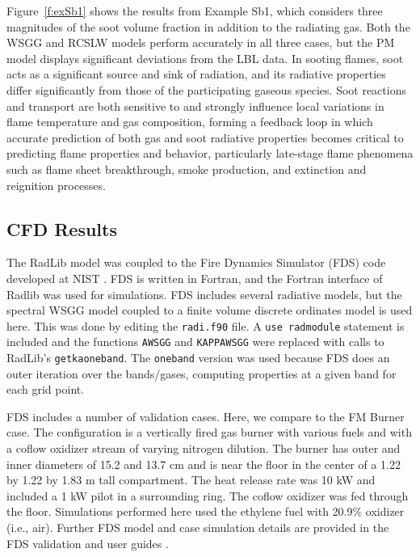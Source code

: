\documentclass[preprint,12pt]{elsarticle}
\begin{document}
Figure~\ref{f:exSb1} shows the results from Example Sb1, which considers three magnitudes of the soot volume fraction in addition to the radiating gas. Both the WSGG and RCSLW models perform accurately in all three cases, but the PM model displays significant deviations from the LBL data. In sooting flames, soot acts as a significant source and sink of radiation, and its radiative properties differ significantly from those of the participating gaseous species. Soot reactions and transport are both sensitive to and strongly influence local variations in flame temperature and gas composition, forming a feedback loop in which accurate prediction of both gas and soot radiative properties becomes critical to predicting flame properties and behavior, particularly late-stage flame phenomena such as flame sheet breakthrough, smoke production, and extinction and reignition processes.




\subsection{CFD Results} \label{s:cfd}

The RadLib model was coupled to the Fire Dynamics Simulator (FDS) code developed at NIST \cite{FDS}. FDS is written in Fortran, and the Fortran interface of Radlib was used for simulations. FDS includes several radiative models, but the spectral WSGG model coupled to a finite volume discrete ordinates model is used here. This was done by editing the \texttt{radi.f90} file. A \texttt{use rad\textunderscore module} statement is included and the functions \texttt{A\textunderscore WSGG} and \texttt{KAPPA\textunderscore WSGG} were replaced with calls to RadLib's \texttt{get\textunderscore k\textunderscore a\textunderscore oneband}. The \texttt{oneband} version was used because FDS does an outer iteration over the bands/gases, computing properties at a given band for each grid point. 

FDS includes a number of validation cases. Here, we compare to the FM Burner case. The configuration is a vertically fired gas burner with various fuels and with a coflow oxidizer stream of varying nitrogen dilution. The burner has outer and inner diameters of 15.2 and 13.7 cm and is near the floor in the center of a 1.22 by 1.22 by 1.83 m tall compartment. The heat release rate was 10 kW and included a 1 kW pilot in a surrounding ring. The coflow oxidizer was fed through the floor. Simulations performed here used the ethylene fuel with 20.9\%  oxidizer (i.e., air). Further FDS model and case simulation details are provided in the FDS validation and user guides \cite{FDS}.
\end{document}
